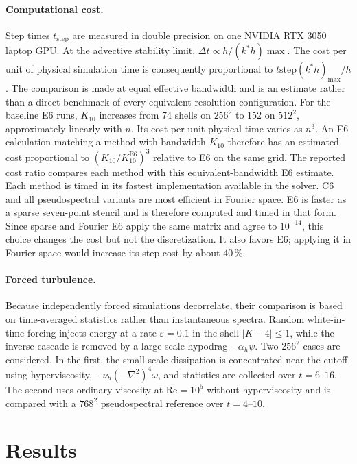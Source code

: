 \documentclass[11pt,a4paper]{article}
\newcommand{\Rey}{\mathrm{Re}}
\begin{document}
\paragraph{Computational cost.}
Step times $t_{\mathrm{step}}$ are measured in double precision on one NVIDIA RTX 3050 laptop GPU. At the advective stability limit,
$\Delta t\propto h/(k^*h){\max}$.
The cost per unit of physical simulation time is consequently proportional to
$t{\mathrm{step}}(k^*h)_{\max}/h$.
The comparison is made at equal effective bandwidth and is an estimate rather than a direct benchmark of every equivalent-resolution configuration. For the baseline E6 runs, $K_{10}$ increases from 74 shells on $256^2$ to 152 on $512^2$, approximately linearly with $n$. Its cost per unit physical time varies as $n^3$. An E6 calculation matching a method with bandwidth $K_{10}$ therefore has an estimated cost proportional to
$(K_{10}/K_{10}^{\mathrm{E6}})^3$
relative to E6 on the same grid. The reported cost ratio compares each method with this equivalent-bandwidth E6 estimate.
Each method is timed in its fastest implementation available in the solver. C6 and all pseudospectral variants are most efficient in Fourier space. E6 is faster as a sparse seven-point stencil and is therefore computed and timed in that form. Since sparse and Fourier E6 apply the same matrix and agree to $10^{-14}$, this choice changes the cost but not the discretization. It also favors E6; applying it in Fourier space would increase its step cost by about $40\,\%$.
\paragraph{Forced turbulence.}
Because independently forced simulations decorrelate, their comparison is based on time-averaged statistics rather than instantaneous spectra. Random white-in-time forcing injects energy at a rate $\varepsilon=0.1$ in the shell $|K-4|\le1$, while the inverse cascade is removed by a large-scale hypodrag $-\alpha_h\psi$.
Two $256^2$ cases are considered. In the first, the small-scale dissipation is concentrated near the cutoff using hyperviscosity,
$-\nu_h(-\nabla^2)^4\omega$, and statistics are collected over $t=6$--$16$. The second uses ordinary viscosity at $\Rey=10^5$ without hyperviscosity and is compared with a $768^2$ pseudospectral reference over $t=4$--$10$.
\section{Results}
\end{document}
